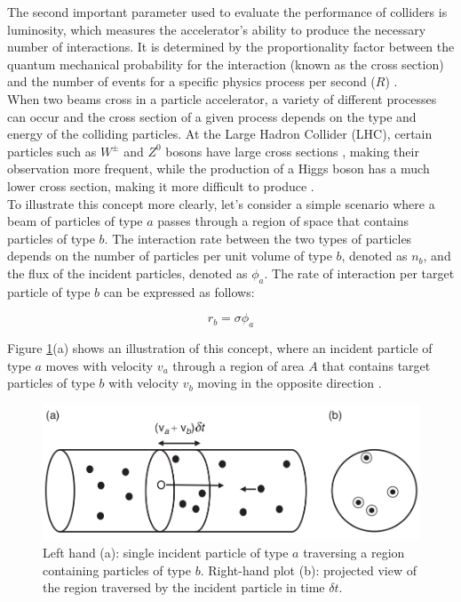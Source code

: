 The second important parameter used to evaluate the performance of colliders is luminosity, which measures the accelerator's ability to produce the necessary number of interactions. It is determined by the proportionality factor between the quantum mechanical probability for the interaction (known as the cross section) and the number of events for a specific physics process per second ($R$) \cite{ref_lib_vol3}.\\

When two beams cross in a particle accelerator, a variety of different processes can occur and  the cross section of a given process depends on the type and energy of the colliding particles.
At the Large Hadron Collider (LHC), certain particles such as  $W^{\pm}$ and $Z^{0}$ bosons have large cross sections , making their observation more frequent, while the production of a Higgs boson has a much lower cross section, making it more difficult to produce \cite{thomson_2013}.\\

To illustrate this concept more clearly, let's consider a simple scenario where a beam of particles of type $a$ passes through a region of space that contains particles of type $b$. The interaction rate between the two types of particles depends on the number of particles per unit volume of type $b$, denoted as $n_{b}$, and the flux of the incident particles, denoted as $\phi_{a}$. The rate of interaction per target particle of type $b$ can be expressed as follows:

\begin{equation*}
  r_{b}=\sigma \phi_{a}
\end{equation*}

Figure \ref{cross_section}(a) shows an illustration of this concept, where an incident particle of type $a$ moves with velocity $v_{a}$ through a region of area $A$ that contains target particles of type $b$ with velocity $v_{b}$ moving in the opposite direction \cite{thomson_2013}.

\begin{center}
  \begin{figure}[h!]
    \centering
\includegraphics[scale=.35]{Chapter1/cross_section.png} 
 \caption[Cross section illustration]{Left hand (a): single incident particle of type $a$ traversing a region containing particles of type $b$. Right-hand plot (b): projected view of the region traversed by the incident particle in time $\delta t$.}
    \label{cross_section}
  \end{figure}
\end{center}

